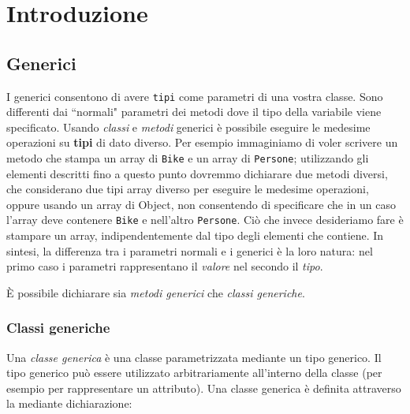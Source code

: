 \documentclass{article}
\author{\textbf{\hmwkAuthorName}}
\date{} %
\begin{document}
\maketitle



\newpage
\tableofcontents
\newpage



\section{Introduzione}

\subsection{Generici}
I generici consentono di avere \texttt{tipi} come parametri di una vostra classe. Sono differenti dai ``normali" parametri  dei metodi dove il tipo della variabile viene specificato. Usando \emph{classi} e \emph{metodi} generici \`e possibile eseguire le medesime operazioni su \textbf{tipi} di dato diverso. Per esempio immaginiamo di voler scrivere un metodo che stampa un array di \texttt{Bike} e un array di \texttt{Persone}; utilizzando gli elementi descritti fino a questo punto dovremmo dichiarare due metodi diversi, che considerano due tipi array diverso per eseguire le medesime operazioni, oppure usando un array di Object, non consentendo di specificare che in un caso l'array deve contenere \texttt{Bike} e nell'altro \texttt{Persone}. Ci\`o che invece desideriamo fare \`e stampare un array, indipendentemente dal tipo degli elementi che contiene. In sintesi,  la differenza tra i parametri normali e i generici \`e la loro natura: nel primo caso i parametri rappresentano il \emph{valore} nel secondo il \emph{tipo}.

\`E possibile dichiarare sia \emph{metodi generici} che \emph{classi generiche}.

\subsubsection{Classi generiche}
Una \emph{classe generica} \`e una classe parametrizzata mediante un tipo generico. Il tipo generico pu\`o essere utilizzato arbitrariamente all'interno della classe (per esempio per rappresentare un attributo). Una classe generica \`e definita attraverso la mediante dichiarazione:
\end{document}

